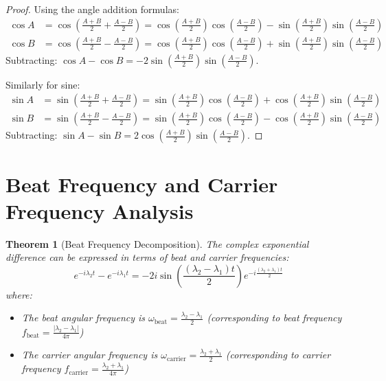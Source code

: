 \documentclass[12pt]{article}
\newtheorem{theorem}{Theorem}
\begin{document}
\begin{proof}
Using the angle addition formulas:
\begin{align}
\cos A &= \cos\left(\frac{A+B}{2} + \frac{A-B}{2}\right) = \cos\left(\frac{A+B}{2}\right)\cos\left(\frac{A-B}{2}\right) - \sin\left(\frac{A+B}{2}\right)\sin\left(\frac{A-B}{2}\right)\\
\cos B &= \cos\left(\frac{A+B}{2} - \frac{A-B}{2}\right) = \cos\left(\frac{A+B}{2}\right)\cos\left(\frac{A-B}{2}\right) + \sin\left(\frac{A+B}{2}\right)\sin\left(\frac{A-B}{2}\right)
\end{align}
Subtracting: $\cos A - \cos B = -2\sin\left(\frac{A+B}{2}\right)\sin\left(\frac{A-B}{2}\right)$.

Similarly for sine:
\begin{align}
\sin A &= \sin\left(\frac{A+B}{2} + \frac{A-B}{2}\right) = \sin\left(\frac{A+B}{2}\right)\cos\left(\frac{A-B}{2}\right) + \cos\left(\frac{A+B}{2}\right)\sin\left(\frac{A-B}{2}\right)\\
\sin B &= \sin\left(\frac{A+B}{2} - \frac{A-B}{2}\right) = \sin\left(\frac{A+B}{2}\right)\cos\left(\frac{A-B}{2}\right) - \cos\left(\frac{A+B}{2}\right)\sin\left(\frac{A-B}{2}\right)
\end{align}
Subtracting: $\sin A - \sin B = 2\cos\left(\frac{A+B}{2}\right)\sin\left(\frac{A-B}{2}\right)$.
\end{proof}

\section{Beat Frequency and Carrier Frequency Analysis}

\begin{theorem}[Beat Frequency Decomposition]
The complex exponential difference can be expressed in terms of beat and carrier frequencies:
\begin{equation}
e^{-i\lambda_2 t} - e^{-i\lambda_1 t} = -2i \sin\left(\frac{(\lambda_2 - \lambda_1)t}{2}\right) e^{-i\frac{(\lambda_2 + \lambda_1)t}{2}}
\end{equation}
where:
\begin{itemize}
\item The beat angular frequency is $\omega_{\text{beat}} = \frac{\lambda_2 - \lambda_1}{2}$ (corresponding to beat frequency $f_{\text{beat}} = \frac{|\lambda_2 - \lambda_1|}{4\pi}$)
\item The carrier angular frequency is $\omega_{\text{carrier}} = \frac{\lambda_2 + \lambda_1}{2}$ (corresponding to carrier frequency $f_{\text{carrier}} = \frac{\lambda_2 + \lambda_1}{4\pi}$)
\end{itemize}
\end{theorem}
\end{document}

